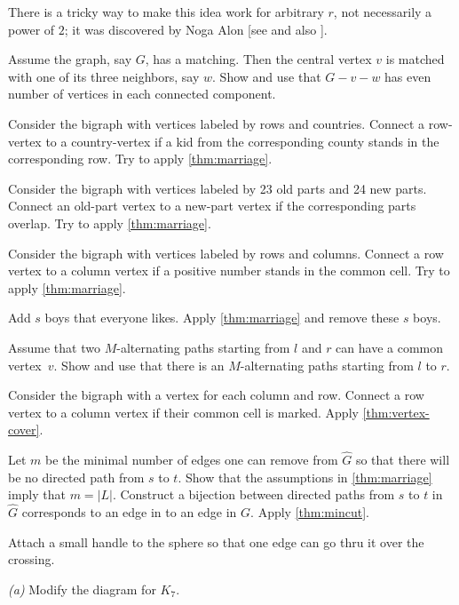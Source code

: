 There is a tricky way to make this idea work for arbitrary $r$, not necessarily a power of $2$; 
it was discovered by Noga Alon [see  and also ]. 

Assume the graph, say $G$, has a matching.
Then the central vertex $v$ is matched with one of its three neighbors, say $w$.
Show and use that $G-v-w$ has even number of vertices in each connected component.

Consider the bigraph with vertices labeled by rows and countries.
Connect a row-vertex to a country-vertex if a kid from the corresponding county stands in the corresponding row.
Try to apply \ref{thm:marriage}.

Consider the bigraph with vertices labeled by 23 old parts and 24 new parts.
Connect an old-part vertex to a new-part vertex if the corresponding parts overlap.
Try to apply \ref{thm:marriage}.

Consider the bigraph with vertices labeled by rows and columns.
Connect a row vertex to a column vertex if a positive number stands in the common cell.
Try to apply \ref{thm:marriage}.

Add $s$ boys that everyone likes.
Apply \ref{thm:marriage} and remove these $s$ boys.

Assume that two $M$-alternating paths starting from $l$ and $r$ can have a common vertex~$v$.
Show and use that there is an $M$-alternating paths starting from $l$ to $r$.

 Consider the bigraph with a vertex for each column and row.
Connect a row vertex to a column vertex if their common cell is marked.
Apply \ref{thm:vertex-cover}.

Let $m$ be the minimal number of edges one can remove from $\hat G$ 
so that there will be no directed path from $s$ to $t$.
Show that the assumptions in \ref{thm:marriage} imply that $m=|L|$.
Construct a bijection between directed paths from $s$ to $t$ in $\hat G$ 
corresponds to an edge in to an edge in $G$.
Apply \ref{thm:mincut}.

\setcounter{eqtn}{0}

Attach a small handle to the sphere so that one edge can go thru it over the crossing.

\textit{(a)}
Modify the diagram for $K_7$.

